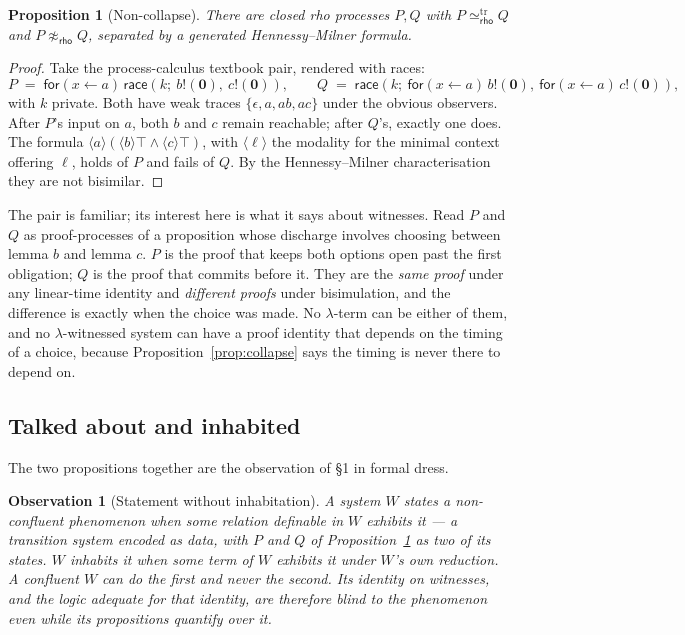 \documentclass[11pt]{article}
\theoremstyle{plain}
\newtheorem{proposition}[theorem]{Proposition}
\newtheorem{observation}[theorem]{Observation}
\theoremstyle{definition}
\theoremstyle{remark}
\newcommand{\rhoc}{\textsf{rho}}
\newcommand{\bisW}[1]{\approx_{#1}}
\newcommand{\treq}[1]{\simeq^{\mathrm{tr}}_{#1}}
\newcommand{\inp}[3]{\mathsf{for}(#1 \leftarrow #2)\,#3}
\newcommand{\out}[2]{#1!(#2)}
\newcommand{\nil}{\mathbf{0}}
\newcommand{\dia}[1]{\langle #1 \rangle}
\begin{document}
\begin{proposition}[Non-collapse]\label{prop:noncollapse}
There are closed rho processes $P, Q$ with $P \treq{\rhoc} Q$ and
$P \not\bisW{\rhoc} Q$, separated by a generated Hennessy--Milner formula.
\end{proposition}

\begin{proof}
Take the process-calculus textbook pair, rendered with races:
\[
P \;=\; \inp{x}{a}{\mathsf{race}(k;\ \out{b}{\nil},\ \out{c}{\nil})},
\qquad
Q \;=\; \mathsf{race}(k;\ \inp{x}{a}{\out{b}{\nil}},\ \inp{x}{a}{\out{c}{\nil}}),
\]
with $k$ private. Both have weak traces $\{\epsilon, a, ab, ac\}$ under the
obvious observers. After $P$'s input on $a$, both $b$ and $c$ remain
reachable; after $Q$'s, exactly one does. The formula
$\dia{a}(\dia{b}\top \wedge \dia{c}\top)$, with $\dia{\ell}$ the modality for
the minimal context offering $\ell$, holds of $P$ and fails of $Q$. By the
Hennessy--Milner characterisation~\cite{HennessyMilner85} they are not
bisimilar.
\end{proof}

The pair is familiar; its interest here is what it says about witnesses. Read
$P$ and $Q$ as proof-processes of a proposition whose discharge involves
choosing between lemma $b$ and lemma $c$. $P$ is the proof that keeps both
options open past the first obligation; $Q$ is the proof that commits before
it. They are the \emph{same proof} under any linear-time identity and
\emph{different proofs} under bisimulation, and the difference is exactly when
the choice was made. No $\lambda$-term can be either of them, and no
$\lambda$-witnessed system can have a proof identity that depends on the
timing of a choice, because Proposition~\ref{prop:collapse} says the timing is
never there to depend on.

\subsection{Talked about and inhabited}

The two propositions together are the observation of \S1 in formal dress.

\begin{observation}[Statement without inhabitation]\label{obs:inhabit}
A system $W$ \emph{states} a non-confluent phenomenon when some relation
definable in $W$ exhibits it --- a transition system encoded as data, with
$P$ and $Q$ of Proposition~\ref{prop:noncollapse} as two of its states. $W$
\emph{inhabits} it when some term of $W$ exhibits it under $W$'s own
reduction. A confluent $W$ can do the first and never the second. Its identity
on witnesses, and the logic adequate for that identity, are therefore blind
to the phenomenon even while its propositions quantify over it.
\end{observation}
\end{document}
